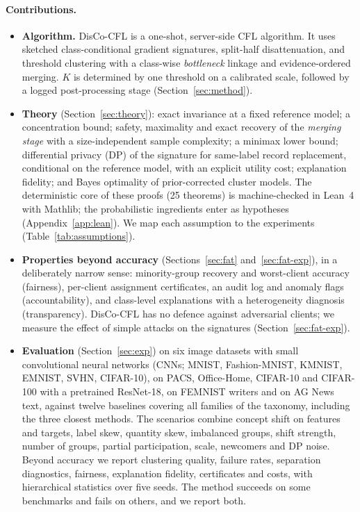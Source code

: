 \documentclass[11pt]{article}
\theoremstyle{definition}
\theoremstyle{remark}
\begin{document}
\paragraph{Contributions.}
\begin{itemize}[leftmargin=*,itemsep=1pt]
\item \textbf{Algorithm.} DisCo-CFL is a one-shot, server-side CFL algorithm. It uses sketched class-conditional gradient signatures, split-half disattenuation, and threshold clustering with a class-wise \emph{bottleneck} linkage and evidence-ordered merging. $K$ is determined by one threshold on a calibrated scale, followed by a logged post-processing stage (Section~\ref{sec:method}).
\item \textbf{Theory} (Section~\ref{sec:theory}): exact invariance at a fixed reference model; a concentration bound; safety, maximality and exact recovery of the \emph{merging stage} with a size-independent sample complexity; a minimax lower bound; differential privacy (DP) of the signature for same-label record replacement, conditional on the reference model, with an explicit utility cost; explanation fidelity; and Bayes optimality of prior-corrected cluster models. The deterministic core of these proofs (25 theorems) is machine-checked in Lean~4 with Mathlib; the probabilistic ingredients enter as hypotheses (Appendix~\ref{app:lean}). We map each assumption to the experiments (Table~\ref{tab:assumptions}).
\item \textbf{Properties beyond accuracy} (Sections~\ref{sec:fat} and~\ref{sec:fat-exp}), in a deliberately narrow sense: minority-group recovery and worst-client accuracy (fairness), per-client assignment certificates, an audit log and anomaly flags (accountability), and class-level explanations with a heterogeneity diagnosis (transparency). DisCo-CFL has no defence against adversarial clients; we measure the effect of simple attacks on the signatures (Section~\ref{sec:fat-exp}).
\item \textbf{Evaluation} (Section~\ref{sec:exp}) on six image datasets with small convolutional neural networks (CNNs; MNIST, Fashion-MNIST, KMNIST, EMNIST, SVHN, CIFAR-10), on PACS, Office-Home, CIFAR-10 and CIFAR-100 with a pretrained ResNet-18, on FEMNIST writers and on AG News text, against twelve baselines covering all families of the taxonomy, including the three closest methods. The scenarios combine concept shift on features and targets, label skew, quantity skew, imbalanced groups, shift strength, number of groups, partial participation, scale, newcomers and DP noise. Beyond accuracy we report clustering quality, failure rates, separation diagnostics, fairness, explanation fidelity, certificates and costs, with hierarchical statistics over five seeds. The method succeeds on some benchmarks and fails on others, and we report both.
\end{itemize}
\end{document}
